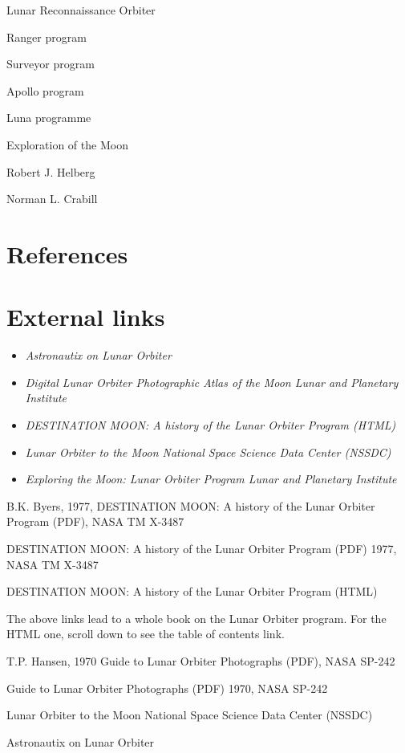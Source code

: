 Lunar Reconnaissance Orbiter

Ranger program

Surveyor program

Apollo program

Luna programme

Exploration of the Moon

Robert J. Helberg

Norman L. Crabill

\section{References}\label{references}

\section{External links}\label{external-links}

\begin{itemize}
\item
  \emph{Astronautix on Lunar Orbiter}
\item
  \emph{Digital Lunar Orbiter Photographic Atlas of the Moon Lunar and
  Planetary Institute}
\item
  \emph{DESTINATION MOON: A history of the Lunar Orbiter Program (HTML)}
\item
  \emph{Lunar Orbiter to the Moon National Space Science Data Center
  (NSSDC)}
\item
  \emph{Exploring the Moon: Lunar Orbiter Program Lunar and Planetary
  Institute}
\end{itemize}

B.K. Byers, 1977, DESTINATION MOON: A history of the Lunar Orbiter
Program (PDF), NASA TM X-3487

DESTINATION MOON: A history of the Lunar Orbiter Program (PDF) 1977,
NASA TM X-3487

DESTINATION MOON: A history of the Lunar Orbiter Program (HTML)

The above links lead to a whole book on the Lunar Orbiter program. For
the HTML one, scroll down to see the table of contents link.

T.P. Hansen, 1970 Guide to Lunar Orbiter Photographs (PDF), NASA SP-242

Guide to Lunar Orbiter Photographs (PDF) 1970, NASA SP-242

Lunar Orbiter to the Moon National Space Science Data Center (NSSDC)

Astronautix on Lunar Orbiter

